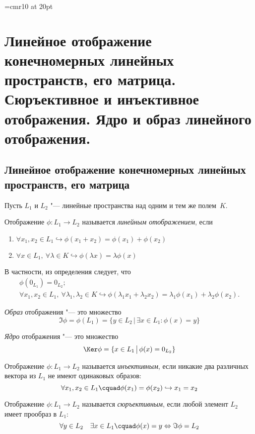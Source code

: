 \font\Large=cmr10 at 20pt
\def\fudge#1{\smash{\hbox{\Large#1}}}
\chapter{Линейное отображение конечномерных линейных пространств, его матрица. Сюръективное и инъективное отображения. Ядро и образ линейного отображения.}

\section{Линейное отображение конечномерных линейных пространств, его матрица}
Пусть $L_1$ и $L_2$ "--- линейные пространства над одним  и тем же полем~$K$.
\begin{defn}
Отображение $\phi\colon L_1\rightarrow L_2$ называется \textit{линейным отображением}, если
\begin{enumerate}
\item $\forall x_1,x_2 \in L_1 \hookrightarrow \phi(x_1+x_2)=\phi(x_1)+\phi(x_2)$
\item $\forall x \in L_1,\ \forall \lambda \in K \hookrightarrow \phi(\lambda x)=\lambda \phi(x)$
\end{enumerate}
\end{defn}
В частности, из определения следует, что
\begin{gather}\label{ch22:eq:eq1}
\phi(0_{L_1}) =0_{L_2};\\
\forall x_1,x_2\in L_1,\ \forall\lambda_1,\lambda_2\in K \hookrightarrow \phi(\lambda_1 x_1 + \lambda_2 x_2) = \lambda_1 \phi(x_1) + \lambda_2 \phi(x_2).
\end{gather}
\begin{defn}
\textit{Образ} отображения "--- это множество 
\begin{equation}
\Im\phi=\phi(L_1)=\{y\in L_2\,\big|\, \exists x\in L_1: \phi(x)=y\}
\end{equation}
\end{defn}
\begin{defn}
\textit{Ядро} отображения "--- это множество 
\begin{equation}
\Ker\phi=\{x\in L_1\,\big|\, \phi(x)=0_{L_2}\}
\end{equation}
\end{defn}
\begin{defn}
Отображение $\phi\colon L_1\rightarrow L_2$ называется \textit{инъективным}, если никакие два различных вектора из $L_1$ не имеют одинаковых образов:
\begin{equation}\label{22.1.inject}
\forall x_1,x_2 \in L_1\cquad \phi(x_1)=\phi(x_2) \hookrightarrow x_1=x_2
\end{equation}
\end{defn}  
\begin{defn}
Отображение $\phi\colon L_1\rightarrow L_2$ называется \textit{сюръективным}, если любой элемент $L_2$ имеет прообраз в $L_1$:
\begin{equation}\label{22.1.surject}
\forall y \in L_2 \quad \exists x \in L_1\cquad \phi(x)=y \Leftrightarrow \Im \phi = L_2
\end{equation}
\end{defn}  

